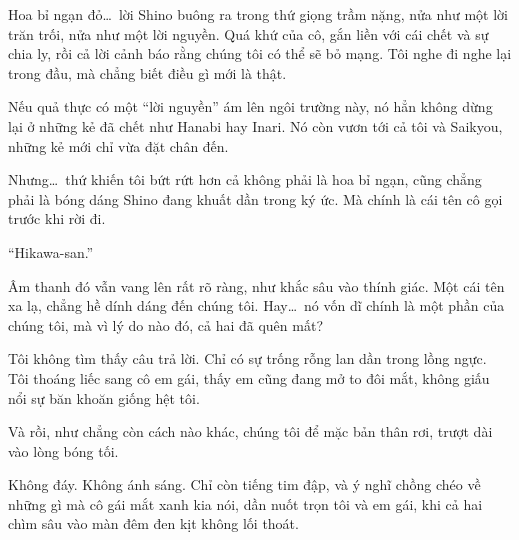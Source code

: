 \documentclass[../main.tex]{subfiles}
\begin{document}
Hoa bỉ ngạn đỏ\dots\ lời Shino buông ra trong thứ giọng trầm nặng, nửa như một lời trăn trối, nửa như một lời nguyền. Quá khứ của cô, gắn liền với cái chết và sự chia ly, rồi cả lời cảnh báo rằng chúng tôi có thể sẽ bỏ mạng. Tôi nghe đi nghe lại trong đầu, mà chẳng biết điều gì mới là thật.

Nếu quả thực có một ``lời nguyền'' ám lên ngôi trường này, nó hẳn không dừng lại ở những kẻ đã chết như Hanabi hay Inari. Nó còn vươn tới cả tôi và Saikyou, những kẻ mới chỉ vừa đặt chân đến.

Nhưng\dots\ thứ khiến tôi bứt rứt hơn cả không phải là hoa bỉ ngạn, cũng chẳng phải là bóng dáng Shino đang khuất dần trong ký ức. Mà chính là cái tên cô gọi trước khi rời đi.

``Hikawa-san.''

Âm thanh đó vẫn vang lên rất rõ ràng, như khắc sâu vào thính giác. Một cái tên xa lạ, chẳng hề dính dáng đến chúng tôi. Hay\dots\ nó vốn dĩ chính là một phần của chúng tôi, mà vì lý do nào đó, cả hai đã quên mất?

Tôi không tìm thấy câu trả lời. Chỉ có sự trống rỗng lan dần trong lồng ngực. Tôi thoáng liếc sang cô em gái, thấy em cũng đang mở to đôi mắt, không giấu nổi sự băn khoăn giống hệt tôi.

Và rồi, như chẳng còn cách nào khác, chúng tôi để mặc bản thân rơi, trượt dài vào lòng bóng tối.

Không đáy. Không ánh sáng. Chỉ còn tiếng tim đập, và ý nghĩ chồng chéo về những gì mà cô gái mắt xanh kia nói, dần nuốt trọn tôi và em gái, khi cả hai chìm sâu vào màn đêm đen kịt không lối thoát.
\end{document}
